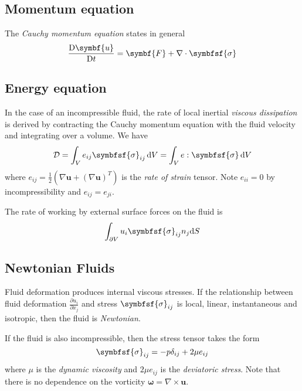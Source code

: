 \documentclass{jknotes}
\begin{document}
\subsection{Momentum equation}
The \emph{Cauchy momentum equation} states in general
\begin{equation}
	\frac{\diffD{\symbf{u}}}{\diffD{t}} = \symbf{F} + \nabla \cdot
	\symbfsf{\sigma}
\end{equation}

\subsection{Energy equation}
In the case of an incompressible fluid, the rate of local inertial
\emph{viscous dissipation} is derived by contracting the Cauchy momentum
equation with the fluid velocity and integrating over a volume. We have
\begin{equation}
	\mathcal{D} = \int_V e_{ij} \symbfsf{\sigma}_{ij} \,\diffd{V} = \int_V
	e:\symbfsf{\sigma} \, \diffd{V}
\end{equation}
where $e_{ij} = \frac{1}{2}\left(\nabla \symbf{u} + \left(\nabla
\symbf{u}\right)^T\right)$ is the \emph{rate of strain} tensor. Note $e_{ii} = 0$
by incompressibility and $e_{ij} = e_{ji}$. 

The rate of working by external surface forces on the fluid is
\begin{equation}
	\int_{\partial V} u_i \symbfsf{\sigma}_{ij} n_j \diffd{S}
\end{equation}

\subsection{Newtonian Fluids}
\begin{defn}
Fluid deformation produces internal viscous stresses. If the relationship
between fluid deformation $\frac{\partial u_i}{\partial x_j}$ and stress
$\symbfsf{\sigma}_{ij}$ is local, linear, instantaneous and isotropic, then the fluid is
\emph{Newtonian}.
\end{defn}

If the fluid is also incompressible, then the stress tensor takes the form
\begin{equation}
	\symbfsf{\sigma}_{ij} = -p \delta_{ij} + 2\mu e_{ij}
\end{equation}
where $\mu$ is the \emph{dynamic viscosity} and $2 \mu e_{ij}$ is the
\emph{deviatoric stress}. Note that there is no dependence on the vorticity
$\symbf{\omega} = \nabla \times \symbf{u}$.
\end{document}
